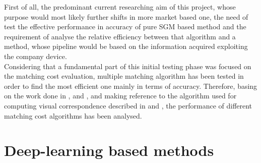 First of all, the predominant current researching aim of this project, whose purpose would most likely further shifts in more market based one, the need of test the effective performance in accuracy of pure SGM based method and the requirement of analyse the relative efficiency between that algorithm and a method, whose pipeline would be based on the information acquired exploiting the company device. \\
Considering that a fundamental part of this initial testing phase was focused on the matching cost evaluation, multiple matching algorithm has been tested in order to find the most efficient one mainly in terms of accuracy. 
Therefore, basing on the work done in \cite{Hirschmuller2007}, \cite{Patil2013} and \cite{Ko2017}, and making reference to the algorithm used for computing visual correspondence described in \cite{Zabih1994} and \cite{Demetz2013}, the performance of different matching cost algorithms has been analysed. 


\section{Deep-learning based methods}
\label{section:deep-learning-method}

